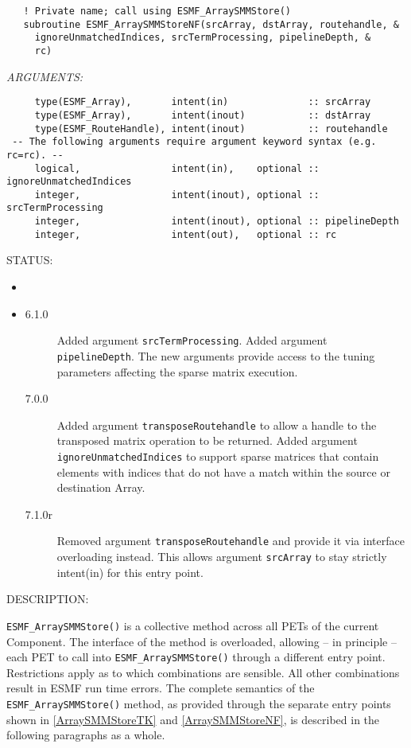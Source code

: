   
\begin{verbatim}   ! Private name; call using ESMF_ArraySMMStore()
   subroutine ESMF_ArraySMMStoreNF(srcArray, dstArray, routehandle, &
     ignoreUnmatchedIndices, srcTermProcessing, pipelineDepth, &
     rc)\end{verbatim}{\em ARGUMENTS:}
\begin{verbatim}     type(ESMF_Array),       intent(in)              :: srcArray
     type(ESMF_Array),       intent(inout)           :: dstArray
     type(ESMF_RouteHandle), intent(inout)           :: routehandle
 -- The following arguments require argument keyword syntax (e.g. rc=rc). --
     logical,                intent(in),    optional :: ignoreUnmatchedIndices
     integer,                intent(inout), optional :: srcTermProcessing
     integer,                intent(inout), optional :: pipelineDepth
     integer,                intent(out),   optional :: rc\end{verbatim}
{\sf STATUS:}
   \begin{itemize}
   \item{}
   \item{}
   \begin{description}
   \item[6.1.0] Added argument {\tt srcTermProcessing}.
                Added argument {\tt pipelineDepth}.
                The new arguments provide access to the tuning parameters
                affecting the sparse matrix execution.
   \item[7.0.0] Added argument {\tt transposeRoutehandle} to allow a handle to
                the transposed matrix operation to be returned.\newline
                Added argument {\tt ignoreUnmatchedIndices} to support sparse 
                matrices that contain elements with indices that do not have a
                match within the source or destination Array.
   \item[7.1.0r] Removed argument {\tt transposeRoutehandle} and provide it
                via interface overloading instead. This allows argument 
                {\tt srcArray} to stay strictly intent(in) for this entry point.
   \end{description}
   \end{itemize}
  
{\sf DESCRIPTION:\\ }


   \label{ArraySMMStoreNF}
   {\tt ESMF\_ArraySMMStore()} is a collective method across all PETs of the
   current Component. The interface of the method is overloaded, allowing 
   -- in principle -- each PET to call into {\tt ESMF\_ArraySMMStore()}
   through a different entry point. Restrictions apply as to which combinations
   are sensible. All other combinations result in ESMF run time errors. The
   complete semantics of the {\tt ESMF\_ArraySMMStore()} method, as provided
   through the separate entry points shown in \ref{ArraySMMStoreTK} and
   \ref{ArraySMMStoreNF}, is described in the following paragraphs as a whole.
  
